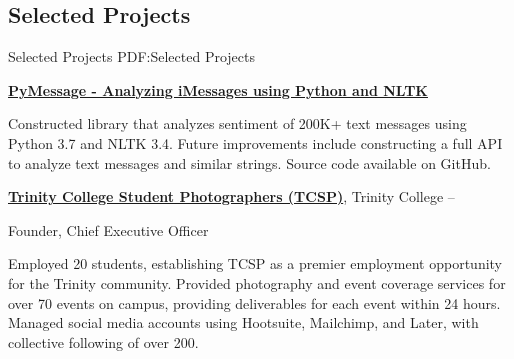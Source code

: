 \documentclass[letterpaper,10pt,oneside]{article}
\begin{document}
\begin{body}
\noindent\hrulefill
\section
{Selected Projects}
{Selected Projects}
{PDF:Selected Projects}

\href{https://github.com/miloszkowal/PyMessage}
{\textbf{PyMessage - Analyzing iMessages using Python and NLTK}}
\hfill

\GapNoBreak
\BulletItem
Constructed library that analyzes sentiment of 200K+ text messages using Python 3.7 and NLTK 3.4.
\BulletItem
Future improvements include constructing a full API to analyze text messages and similar strings.
\BulletItem
Source code available on GitHub.

\BigGapNoBreak

\href{http://commons.trincoll.edu/tcsp}
{\textbf{Trinity College Student Photographers (TCSP)}},
Trinity College
\hfill
{} --

\GapNoBreak
\BulletItem
Founder, Chief Executive Officer
\begin{detail}
\SubBulletItem
Employed 20 students, establishing TCSP as a premier employment opportunity for the Trinity community.
\SubBulletItem
Provided photography and event coverage services for over 70 events on campus, providing deliverables for each event within 24 hours.
\SubBulletItem
Managed social media accounts using Hootsuite, Mailchimp, and Later, with collective following of over 200.
\end{detail}

\begin{comment}


\href{http://commons.trincoll.edu/tripod}
{\textbf{Trinity Tripod}},
Trinity College
\hfill
\DatestampYMD{2017}{08}{01} --
\DatestampYMD{2018}{01}{01}

\GapNoBreak
\BulletItem
Photography Editor
\begin{detail}
\SubBulletItem
Collaborated with Trinity College Student Photographers to provide photographic content for weekly paper.
\SubBulletItem
Delivered hundreds of images for a variety of different stories, including custom stock imagery.
\SubBulletItem
Developed automated system for photo captioning using EXIF data, extracted using Adobe InDesign, resulting in 75\% time decrease when formatting images.
\end{detail}
\end{comment}


\end{body}
\end{document}
